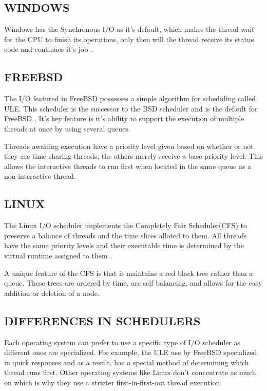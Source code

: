 \documentclass[letterpaper, 10 pt, conference]{ieeeconf}  %
\begin{document}
\subsection{WINDOWS}

Windows has the Synchronous I/O as it's default, which makes the thread wait for the CPU to finish its operations, only then will the thread receive its status code and continues it's job \cite{4}.  

\subsection{FREEBSD}

The I/O featured in FreeBSD possesses a simple algorithm for scheduling called ULE. This scheduler is the successor to the BSD scheduler and is the default for FreeBSD \cite{2}. It's key feature is it's ability to support the execution of multiple threads at once by using several queues.\par
Threads awaiting execution have a priority level given based on whether or not they are time sharing threads, the others merely receive a base priority level. This allows the interactive threads to run first when located in the same queue as a non-interactive thread.

\subsection{LINUX}

The Linux I/O scheduler implements the Completely Fair Scheduler(CFS) to preserve a balance of threads and the time slices alloted to them. All threads have the same priority levels and their executable time is determined by the virtual runtime assigned to them \cite{3}.\par
A unique feature of the CFS is that it maintains a red black tree rather than a queue. These trees are ordered by time, are self balancing, and allows for the easy addition or deletion of a node.

\subsection{DIFFERENCES IN SCHEDULERS}

Each operating system can prefer to use a specific type of I/O scheduler as different ones are specialized. For example, the ULE use by FreeBSD specialized in quick responses and as a result, has a special method of determining which thread runs first. Other operating systems like Linux don't concentrate as much on which is  why they use a stricter first-in-first-out thread execution.
\end{document}
